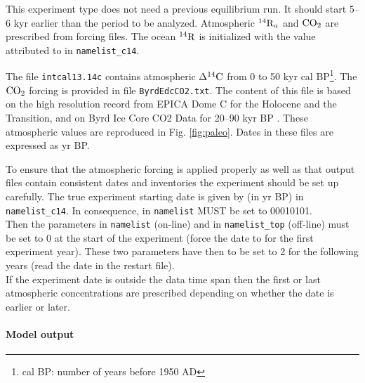 \documentclass[../main/TOP_manual]{subfiles}
\begin{document}
This experiment type does not need a previous equilibrium run.
It should start 5--6 kyr earlier than the period to be analyzed.
Atmospheric $\mathrm{^{14}{R}}_a$ and $\mathrm{CO_2}$ are prescribed from forcing files.
The ocean $\mathrm{^{14}{R}}$ is initialized with the value attributed to  in \texttt{namelist\_c14}.

The file \texttt{intcal13.14c} \citep{reimer_2013} contains atmospheric $\Delta ^{14}\mathrm{C}$ from 0 to 50 kyr cal BP\footnote{cal BP: number of years before 1950 AD}.
The $\mathrm{CO_2}$ forcing is provided in file \texttt{ByrdEdcCO2.txt}.
The content of this file is based on  the high resolution record from EPICA Dome C \citep{monnin_2004} for the Holocene and the Transition, and on Byrd Ice Core CO2 Data for 20--90 kyr BP  \citep{ahn_2008}.
These atmospheric values are reproduced in Fig. \autoref{fig:paleo}.
Dates in these files are expressed as yr BP.

To ensure that the atmospheric forcing is applied properly as well as that output files contain consistent dates and inventories the experiment should be set up carefully.
The true experiment starting date is given by  (in yr BP) in \texttt{namelist\_c14}.
In consequence,  in \texttt{namelist} MUST be set to 00010101.\\
Then the parameters  in  \texttt{namelist} (on-line) and  in \texttt{namelist\_top} (off-line)  must be set to 0 at the start of the experiment (force the date to  for the first experiment year).
These two parameters have then to be set to 2 for the following years (read the date in the restart file). \\
If the experiment date is outside the data time span then the first or last atmospheric concentrations are prescribed depending on whether the date is earlier or later.

%
\paragraph{Model output}
\label{sec:output}
\end{document}
